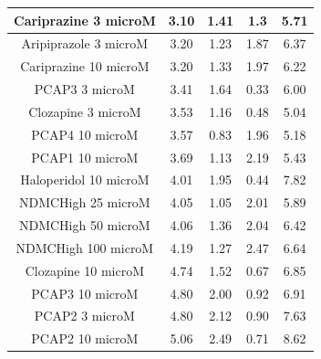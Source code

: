 \documentclass[a4paper,12pt]{article}
\begin{document}
\begin{table}[h!]
\begin{tabular}{|c|c|c|c|c|}
Cariprazine 3 microM   & 3.10  & 1.41 & 1.3  & 5.71 \\ \hline
Aripiprazole 3 microM  & 3.20  & 1.23 & 1.87 & 6.37 \\ \hline
Cariprazine 10 microM  & 3.20  & 1.33 & 1.97 & 6.22 \\ \hline
PCAP3 3 microM       & 3.41 & 1.64 & 0.33 & 6.00    \\ \hline
Clozapine 3 microM     & 3.53 & 1.16 & 0.48 & 5.04 \\ \hline
PCAP4 10 microM      & 3.57 & 0.83 & 1.96 & 5.18 \\ \hline
PCAP1 10 microM        & 3.69 & 1.13 & 2.19 & 5.43 \\ \hline
Haloperidol 10 microM  & 4.01 & 1.95 & 0.44 & 7.82 \\ \hline
NDMCHigh 25 microM     & 4.05 & 1.05 & 2.01 & 5.89 \\ \hline
NDMCHigh 50 microM     & 4.06 & 1.36 & 2.04 & 6.42 \\ \hline
NDMCHigh 100 microM    & 4.19 & 1.27 & 2.47 & 6.64 \\ \hline
Clozapine 10 microM    & 4.74 & 1.52 & 0.67 & 6.85 \\ \hline
PCAP3 10 microM      & 4.80  & 2.00    & 0.92 & 6.91 \\ \hline
PCAP2 3 microM         & 4.80  & 2.12 & 0.90  & 7.63 \\ \hline
PCAP2 10 microM        & 5.06 & 2.49 & 0.71 & 8.62 \\ \hline
\end{tabular}
\end{table}
\newpage
\end{document}
